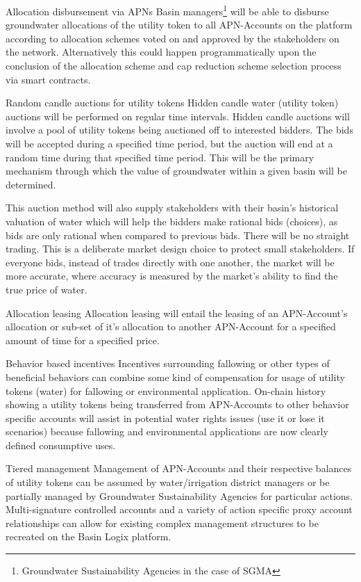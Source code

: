 \documentclass{tufte-handout}
\begin{document}
Allocation disbursement via APNs \break
Basin managers\footnote{Groundwater Sustainability Agencies in the case of SGMA} will be able to disburse groundwater allocations of the utility token to all APN-Accounts on the platform according to allocation schemes voted on and approved by the stakeholders on the network. Alternatively this could happen programmatically upon the conclusion of the allocation scheme and cap reduction scheme selection process via smart contracts. 

Random candle auctions for utility tokens \break
Hidden candle water (utility token) auctions will be performed on regular time intervals. Hidden candle auctions\cite{candle} will involve a pool of utility tokens being auctioned off to interested bidders. The bids will be accepted during a specified time period, but the auction will end at a random time during that specified time period. This will be the primary mechanism through which the value of groundwater within a given basin will be determined. 

This auction method will also supply stakeholders with their basin's historical valuation of water which will help the bidders make rational bids (choices), as bids are only rational when compared to previous bids\cite{Allingham}. There will be no straight trading. This is a deliberate market design choice to protect small stakeholders\cite{Raffensperger}. If everyone bids, instead of trades directly with one another, the market will be more accurate, where accuracy is measured by the market's ability to find the true price of water.\break

Allocation leasing \break
Allocation leasing will entail the leasing of an APN-Account's allocation or sub-set of it's allocation to another APN-Account for a specified amount of time for a specified price.\break

Behavior based incentives \break
Incentives surrounding fallowing or other types of beneficial behaviors can combine some kind of compensation for usage of utility tokens (water) for fallowing or environmental application\cite{tule}. On-chain history showing a utility tokens being transferred from APN-Accounts to other behavior specific accounts will assist in potential water rights issues (use it or lose it scenarios) because fallowing and environmental applications are now clearly defined consumptive uses.\break

Tiered management \break
Management of APN-Accounts and their respective balances of utility tokens can be assumed by water/irrigation district managers or be partially managed by Groundwater Sustainability Agencies for particular actions. Multi-signature controlled accounts and a variety of action specific proxy account relationships\cite{proxy} can allow for existing complex management structures to be recreated on the Basin Logix platform.\break 
\end{document}
